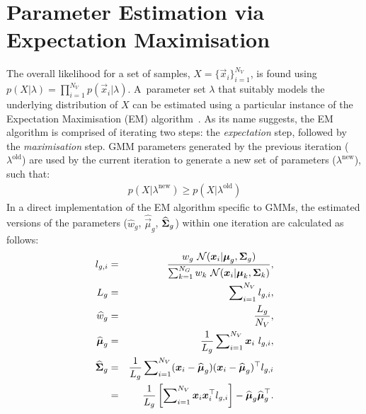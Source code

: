\section{Parameter Estimation via Expectation Maximisation}
\label{sec:param_em}

\noindent
The overall likelihood for a set of samples, $X=\{\Vec{x}_i\}_{i=1}^{N_V}$,
is found using $p(X | \lambda) = \prod\nolimits_{i=1}^{N_V} p(\Vec{x}_i | \lambda)$.
A~parameter set $\lambda$ that suitably models the underlying distribution of $X$ can be estimated using a particular instance of the Expectation Maximisation (EM) algorithm~\cite{Dempster77, McLachlan-2008, Moon96, Redner84}.
As its name suggests, the EM algorithm is comprised of iterating two steps: the {\it expectation} step, followed by the {\it maximisation} step.
GMM parameters generated by the previous iteration ($\lambda^{\textrm{old}}$) are used
by the current iteration to generate a new set of parameters ($\lambda^{\textrm{new}}$), such that:
%
\begin{eqnarray}
	p(X|\lambda^{\textrm{new}}) \geq p(X|\lambda^{\textrm{old}})
\end{eqnarray}
%
In a direct implementation of the EM algorithm specific to GMMs,
the estimated versions of the parameters ($\widehat{w}_g$, $\widehat{\Vec{\mu}}_g$, $\widehat{{\boldsymbol{\Sigma}}}_g$)
within one iteration are calculated as follows:
%
\begin{eqnarray}
  l_{g,i}                  & = & \frac{w_g ~ {{\mathcal{N}}}( \Vec{x}_i | \Vec{\mu}_g, \Mat{\Sigma}_g )}{\sum\nolimits_{k=1}^{N_G} w_k ~ {{\mathcal{N}}}( \Vec{x}_i | \Vec{\mu}_k, \Mat{\Sigma}_k )}, \label{eqn:aposteriori} \\
  L_g                      & = & \sum\nolimits_{i=1}^{N_V} l_{g,i}, \\
  \widehat{w}_g            & = & \frac{L_g}{N_V},  \label{eqn:em_weight} \\
  \widehat{\Vec{\mu}}_g    & = & \frac{1}{L_g} \sum\nolimits_{i=1}^{N_V} \Vec{x}_i ~ l_{g,i}  \label{eqn:em_mean}, \\
  \widehat{\Mat{\Sigma}}_g & = & \frac{1}{L_g} \sum\nolimits_{i=1}^{N_V} (\Vec{x}_i - \widehat{\Vec{\mu}}_g)(\Vec{x}_i - \widehat{\Vec{\mu}}_g)^\top l_{g,i} \label{eqn:em_cov} \\
                           & = &  \frac{1}{L_g} \left[ \sum\nolimits_{i=1}^{N_V} \Vec{x}_i \Vec{x}_i^\top l_{g,i} \right] - \widehat{\Vec{\mu}}_g \widehat{\Vec{\mu}}_g^\top.
\end{eqnarray}

